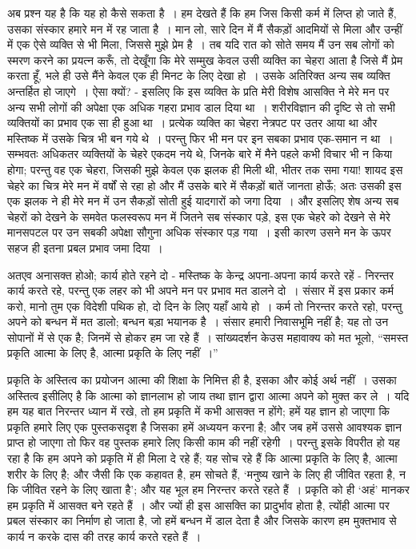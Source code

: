 अब प्रश्न यह है कि यह हो कैसे सकता है~। हम देखते हैं कि हम जिस किसी कर्म में लिप्त हो जाते हैं, उसका संस्कार हमारे मन में रह जाता है~। मान लो, सारे दिन में मैं सैकड़ों आदमियों से मिला और उन्हीं में एक ऐसे व्यक्ति से भी मिला, जिससे मुझे प्रेम है~। तब यदि रात को सोते समय मैं उन सब लोगों को स्मरण करने का प्रयत्न करूँ, तो देखूँगा कि मेरे सम्मुख केवल उसी व्यक्ति का चेहरा आता है जिसे मैं प्रेम करता हूँ, भले ही उसे मैंने केवल एक ही मिनट के लिए देखा हो~। उसके अतिरिक्त अन्य सब व्यक्ति अन्तर्हित हो जाएगे~। ऐसा क्यों? - इसलिए कि इस व्यक्ति के प्रति मेरी विशेष आसक्ति ने मेरे मन पर अन्य सभी लोगों की अपेक्षा एक अधिक गहरा प्रभाव डाल दिया था~। शरीरविज्ञान की दृष्टि से तो सभी व्यक्तियों का प्रभाव एक सा ही हुआ था~। प्रत्येक व्यक्ति का चेहरा नेत्रपट पर उतर आया था और मस्तिष्क में उसके चित्र भी बन गये थे~। परन्तु फिर भी मन पर इन सबका प्रभाव एक-समान न था~। सम्भवतः अधिकतर व्यक्तियों के चेहरे एकदम नये थे, जिनके बारे में मैने पहले कभी विचार भी न किया होगा; परन्तु वह एक चेहरा, जिसकी मुझे केवल एक झलक ही मिली थी, भीतर तक समा गया! शायद इस चेहरे का चित्र मेरे मन में वर्षों से रहा हो और मैं उसके बारे में सैकड़ों बातें जानता होऊँ; अतः उसकी इस एक झलक ने ही मेरे मन में उन सैकड़ों सोती हुई यादगारों को जगा दिया~। और इसलिए शेष अन्य सब चेहरों को देखने के समवेत फलस्वरूप मन में जितने सब संस्कार पड़े, इस एक चेहरे को देखने से मेरे मानसपटल पर उन सबकी अपेक्षा सौगुना अधिक संस्कार पड़ गया~। इसी कारण उसने मन के ऊपर सहज ही इतना प्रबल प्रभाव जमा दिया~।

{ अतएव अनासक्त होओ; कार्य होते रहने दो - मस्तिष्क के केन्द्र अपना-अपना कार्य करते रहें - निरन्तर कार्य करते रहे, परन्तु एक लहर को भी अपने मन पर प्रभाव मत डालने दो~। संसार में इस प्रकार कर्म करो, मानो तुम एक विदेशी पथिक हो, दो दिन के लिए यहाँ आये हो~। कर्म तो निरन्तर करते रहो, परन्तु अपने को बन्धन में मत डालो; बन्धन बड़ा भयानक है~। संसार हमारी निवासभूमि नहीं है; यह तो उन सोपानों में से एक है; जिनमें से होकर हम जा रहे हैं~। सांख्यदर्शन के\parfillskip=0pt}\newpage उस महावाक्य को मत भूलो, “समस्त प्रकृति आत्मा के लिए है, आत्मा प्रकृति के लिए नहीं~।”

प्रकृति के अस्तित्व का प्रयोजन आत्मा की शिक्षा के निमित्त ही है, इसका और कोई अर्थ नहीं~। उसका अस्तित्व इसीलिए है कि आत्मा को ज्ञानलाभ हो जाय तथा ज्ञान द्वारा आत्मा अपने को मुक्त कर ले~। यदि हम यह बात निरन्तर ध्यान में रखे, तो हम प्रकृति में कभी आसक्त न होंगे; हमें यह ज्ञान हो जाएगा कि प्रकृति हमारे लिए एक पुस्तकसदृश है जिसका हमें अध्ययन करना है; और जब हमें उससे आवश्यक ज्ञान प्राप्त हो जाएगा तो फिर वह पुस्तक हमारे लिए किसी काम की नहीं रहेगी~। परन्तु इसके विपरीत हो यह रहा है कि हम अपने को प्रकृति में ही मिला दे रहे हैं; यह सोच रहे हैं कि आत्मा प्रकृति के लिए है, आत्मा शरीर के लिए है; और जैसी कि एक कहावत है, हम सोचते हैं, ‘मनुष्य खाने के लिए ही जीवित रहता है, न कि जीवित रहने के लिए खाता है’; और यह भूल हम निरन्तर करते रहते हैं~। प्रकृति को ही ‘अहं’ मानकर हम प्रकृति में आसक्त बने रहते हैं~। और ज्यों ही इस आसक्ति का प्रादुर्भाव होता है, त्योंही आत्मा पर प्रबल संस्कार का निर्माण हो जाता है, जो हमें बन्धन में डाल देता है और जिसके कारण हम मुक्तभाव से कार्य न करके दास की तरह कार्य करते रहते हैं~।

